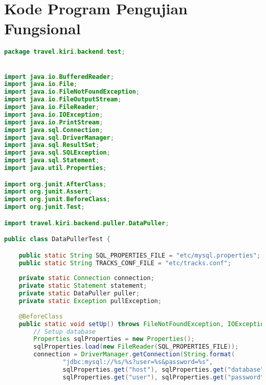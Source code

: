 \chapter{Kode Program Pengujian Fungsional}
\label{app:B}

\singlespacing 
%
%
\begin{lstlisting}[language=Java,basicstyle=\tiny,caption=DataPullerTest.java]
package travel.kiri.backend.test;


import java.io.BufferedReader;
import java.io.File;
import java.io.FileNotFoundException;
import java.io.FileOutputStream;
import java.io.FileReader;
import java.io.IOException;
import java.io.PrintStream;
import java.sql.Connection;
import java.sql.DriverManager;
import java.sql.ResultSet;
import java.sql.SQLException;
import java.sql.Statement;
import java.util.Properties;

import org.junit.AfterClass;
import org.junit.Assert;
import org.junit.BeforeClass;
import org.junit.Test;

import travel.kiri.backend.puller.DataPuller;

public class DataPullerTest {

    public static String SQL_PROPERTIES_FILE = "etc/mysql.properties";
    public static String TRACKS_CONF_FILE = "etc/tracks.conf";
    
    private static Connection connection;
    private static Statement statement;
    private static DataPuller puller;
    private static Exception pullException;
    
    @BeforeClass
    public static void setUp() throws FileNotFoundException, IOException, SQLException {
        // Setup database
        Properties sqlProperties = new Properties();
        sqlProperties.load(new FileReader(SQL_PROPERTIES_FILE));
        connection = DriverManager.getConnection(String.format(
                "jdbc:mysql://%s/%s?user=%s&password=%s",
                sqlProperties.get("host"), sqlProperties.get("database"),
                sqlProperties.get("user"), sqlProperties.get("password")));
        

\end{lstlisting}
